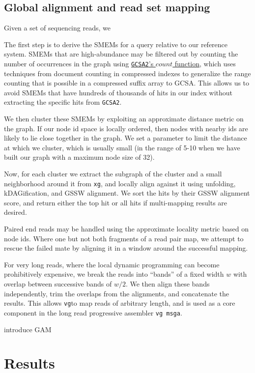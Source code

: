 \documentclass[12pt]{article}
\newcommand{\vg}{{\tt vg}}
\newcommand{\gcsa}{{\tt GCSA2}}
\begin{document}
\subsection{Global alignment and read set mapping}

Given a set of sequencing reads, we 

The first step is to derive the SMEMs for a query relative to our reference system.
SMEMs that are high-abundance may be filtered out by counting the number of occurrences in the graph using \href{https://github.com/jltsiren/gcsa2/releases/tag/v0.6}{\gcsa's $count$ function}, which uses techniques from document counting in compressed indexes to generalize the range counting that is possible in a compressed suffix array to GCSA.
This allows us to avoid SMEMs that have hundreds of thousands of hits in our index without extracting the specific hits from \gcsa.

We then cluster these SMEMs by exploiting an approximate distance metric on the graph.
If our node id space is locally ordered, then nodes with nearby ids are likely to lie close together in the graph.
We set a parameter to limit the distance at which we cluster, which is usually small (in the range of 5-10 when we have built our graph with a maximum node size of 32).

Now, for each cluster we extract the subgraph of the cluster and a small neighborhood around it from {\tt xg}, and locally align against it using unfolding, kDAGification, and GSSW alignment.
We sort the hits by their GSSW alignment score, and return either the top hit or all hits if multi-mapping results are desired.

Paired end reads may be handled using the approximate locality metric based on node ids.
Where one but not both fragments of a read pair map, we attempt to rescue the failed mate by aligning it in a window around the successful mapping.

For very long reads, where the local dynamic programming can become prohibitively expensive, we break the reads into ``bands'' of a fixed width $w$ with overlap between successive bands of $w/2$.
We then align these bands independently, trim the overlaps from the alignments, and concatenate the results.
This allows \vg to map reads of arbitrary length, and is used as a core component in the long read progressive assembler {\tt vg msga}.

{introduce GAM}

\section{Results}
\end{document}
